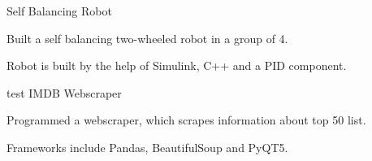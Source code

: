 
\begin{cventries}
  \cventry
    {} %
    {Self Balancing Robot} %
    {} %
    {} %
    {
      \begin{cvitems} %
      	\item {Built a self balancing two-wheeled robot in a group of 4.}
		    \item {Robot is built by the help of Simulink, C++ and a PID component.}
      \end{cvitems}
    }

  \cventry
    {test} %
    {IMDB Webscraper} %
    {} %
    {} %
    {
      \begin{cvitems} %
      	\item {Programmed a webscraper, which scrapes information about top 50 list.}
		    \item {Frameworks include Pandas, BeautifulSoup and PyQT5.}
      \end{cvitems}
    }
\end{cventries}